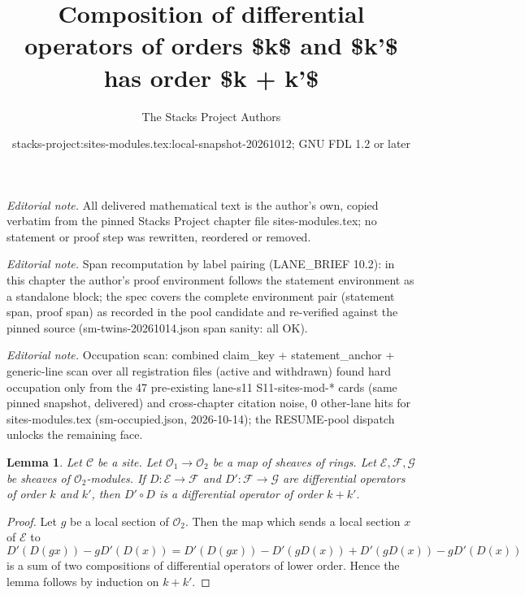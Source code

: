 \documentclass[10pt,a4paper]{amsart}
\title{Composition of differential operators of orders \$k\$ and \$k'\$ has order \$k + k'\$}
\author{The Stacks Project Authors}
\date{stacks-project:sites-modules.tex:local-snapshot-20261012; GNU FDL 1.2 or later}
\theoremstyle{plain}
\newtheorem{lemma}[subsection]{Lemma}
\theoremstyle{definition}
\theoremstyle{remark}
\numberwithin{equation}{subsection}
\begin{document}
\maketitle
\noindent\textit{Editorial note.} All delivered mathematical text is the author's own, copied verbatim from the pinned Stacks Project chapter file sites-modules.tex; no statement or proof step was rewritten, reordered or removed.\par\medskip
\noindent\textit{Editorial note.} Span recomputation by label pairing (LANE\_BRIEF 10.2): in this chapter the author's proof environment follows the statement environment as a standalone block; the spec covers the complete environment pair (statement span, proof span) as recorded in the pool candidate and re-verified against the pinned source (sm-twins-20261014.json span sanity: all OK).\par\medskip
\noindent\textit{Editorial note.} Occupation scan: combined claim\_key + statement\_anchor + generic-line scan over all registration files (active and withdrawn) found hard occupation only from the 47 pre-existing lane-s11 S11-sites-mod-* cards (same pinned snapshot, delivered) and cross-chapter citation noise, 0 other-lane hits for sites-modules.tex (sm-occupied.json, 2026-10-14); the RESUME-pool dispatch unlocks the remaining face.\par\medskip
\begin{lemma}
\label{lemma-composition-differential-operators}
Let $\mathcal{C}$ be a site.
Let $\mathcal{O}_1 \to \mathcal{O}_2$ be a map of sheaves of rings.
Let $\mathcal{E}, \mathcal{F}, \mathcal{G}$ be sheaves of
$\mathcal{O}_2$-modules.
If $D : \mathcal{E} \to \mathcal{F}$ and $D' : \mathcal{F} \to \mathcal{G}$
are differential operators of order $k$ and $k'$, then $D' \circ D$ is a
differential operator of order $k + k'$.
\end{lemma}

\begin{proof}
Let $g$ be a local section of $\mathcal{O}_2$.
Then the map which sends a local section $x$ of $\mathcal{E}$ to
$$
D'(D(gx)) - gD'(D(x)) = D'(D(gx)) - D'(gD(x)) + D'(gD(x)) - gD'(D(x))
$$
is a sum of two compositions of differential operators of lower order.
Hence the lemma follows by induction on $k + k'$.
\end{proof}
\end{document}
